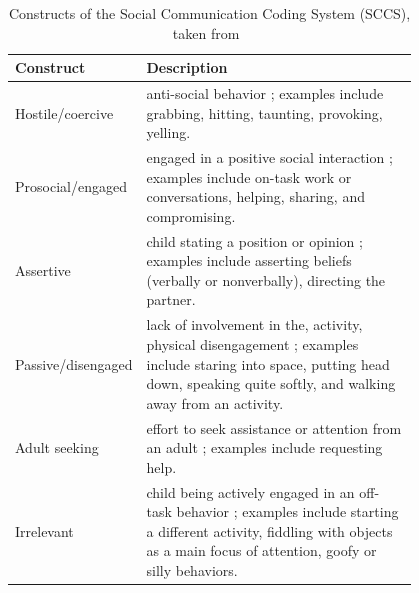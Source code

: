 \documentclass{article}
\begin{document}
\begin{table}[]
\centering
\caption{Constructs of the Social Communication Coding System (SCCS), taken from~\cite{olswang2006reliability}}
\label{table|sccs}
\renewcommand{\arraystretch}{1.8}
\begin{tabular}{@{}lp{0.8\linewidth}@{}}
\toprule
\bf Construct          & \bf Description                                                                                                                                                                                                                                                                                                                                           \\ \midrule
Hostile/coercive   & anti-social behavior ; examples include grabbing, hitting, taunting, provoking, yelling.                                                       \\
Prosocial/engaged  & engaged in a positive social interaction ; examples include on-task work or conversations, helping, sharing, and compromising.                 \\
Assertive          & child stating a position or opinion ; examples include asserting beliefs (verbally or nonverbally), directing the partner.                     \\
Passive/disengaged & lack of involvement in the, activity, physical disengagement ; examples include staring into space, putting head down, speaking quite softly, and walking away from an activity.\\
Adult seeking      & effort to seek assistance or attention from an adult ; examples include requesting help.                                                       \\
Irrelevant         & child being actively engaged in an off-task behavior ; examples include starting a different activity, fiddling with objects as a main focus of attention, goofy or silly behaviors. \\ \bottomrule
\end{tabular}
\end{table}
\end{document}
